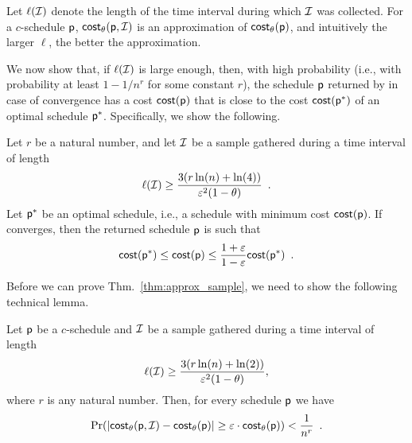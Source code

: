 Let $\ell(\mathcal{I})$ denote the length of the time interval during which
$\mathcal{I}$ was collected. For a $c$-schedule $\mathsf{p}$,
$\mathsf{cost}_\theta(\mathsf{p},\mathcal{I})$ is an approximation of $\mathsf{cost}_\theta(\mathsf{p})$,
and intuitively the larger $\ell$, the better the approximation.

We now show that, if $\ell(\mathcal{I})$ is large enough, then, with high
probability (i.e., with probability at least $1-1/n^r$ for some constant $r$),
the schedule $\mathsf{p}$ returned by \algonameapx in case of convergence has a cost
$\mathsf{cost}(\mathsf{p})$ that is close to the cost $\mathsf{cost}(\mathsf{p}^*)$ of an optimal
schedule $\mathsf{p}^*$.  Specifically, we show the following.

\begin{theorem}\label{thm:approx_sample}
	Let $r$ be a natural number, and let $\mathcal{I}$ be a sample gathered during a
	time interval of length
	\begin{equation}\label{eq:samplesize}
		\ell(\mathcal{I}) \geq
		\frac{3(r\ln(n)+\ln(4))}{\varepsilon^2(1-\theta)}\enspace.
	\end{equation}
	Let $\mathsf{p}^*$ be an optimal schedule, i.e., a schedule with minimum cost
	$\mathsf{cost}(\mathsf{p})$. If \algonameapx converges, then the returned schedule
	$\mathsf{p}$ is such that
	\[
		\mathsf{cost}(\mathsf{p}^*)\le\mathsf{cost}(\mathsf{p})\le\frac{1+\varepsilon}{1-\varepsilon}\mathsf{cost}(\mathsf{p}^*)\enspace.
	\]
\end{theorem}

Before we can prove Thm.~\ref{thm:approx_sample}, we need to show the following
technical lemma.

\begin{lemma}\label{lem:chernoffcost}
	Let $\mathsf{p}$ be a $c$-schedule and $\mathcal{I}$ be a sample gathered during a
	time interval of length
	\[
		\ell(\mathcal{I}) \geq \frac{3(r\ln(n)+\ln(2))}{\varepsilon^2(1-\theta)},
	\]
	where $r$ is any natural number. Then, for every schedule $\mathsf{p}$ we have
	\[
		\Pr(|\mathsf{cost}_\theta(\mathsf{p},\mathcal{I}) - \mathsf{cost}_\theta(\mathsf{p})|\geq
		\varepsilon\cdot\mathsf{cost}_\theta(\mathsf{p})) < \frac{1}{n^r}\enspace .
	\]
\end{lemma}

